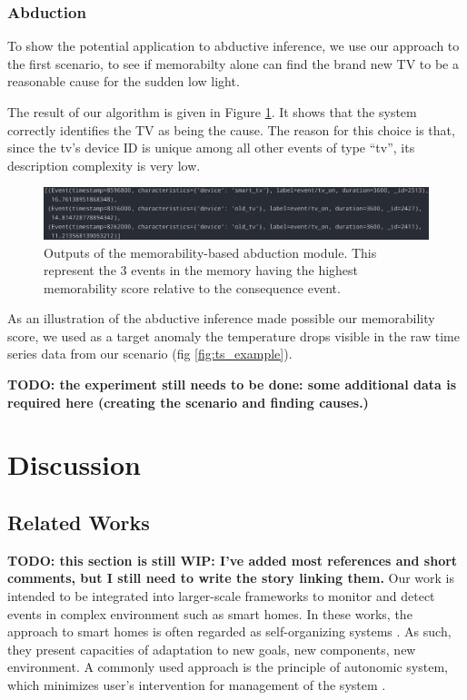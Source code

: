 \documentclass[entropy,article,submit,moreauthors,pdftex]{Definitions/mdpi}
\begin{document}
\subsubsection{Abduction}

To show the potential application to abductive inference, we use our approach to the first scenario, to see if memorabilty alone can find the brand new TV to be a reasonable cause for the sudden low light.

The result of our algorithm is given in Figure \ref{fig:abduction_res}. It shows that the system correctly identifies the TV as being the cause. The reason for this choice is that, since the tv's device ID is unique among all other events of type ``tv'', its description complexity is very low.

\begin{figure}
    \centering
    \includegraphics[width=.8\linewidth]{./figures/abduction_1_results}
    \caption{Outputs of the memorability-based abduction module. This represent the 3 events in the memory having the highest memorability score relative to the consequence event.}
    \label{fig:abduction_res}
\end{figure}

As an illustration of the abductive inference made possible our memorability
score, we used as a target anomaly the temperature drops visible in the raw
time series data from our scenario (fig \ref{fig:ts_example}).

\textbf{TODO: the experiment still needs to be done: some additional data is required here (creating the scenario and finding causes.)}



\section{Discussion}

\subsection{Related Works}
\label{sec:related}
\textbf{TODO: this section is still WIP: I've added most references and short comments, but I still need to write the story linking them.}
Our work is intended to be integrated into larger-scale frameworks to monitor
and detect events in complex environment such as smart homes. In these works, the
approach to smart homes is often regarded as self-organizing systems \cite{kramer_rigorous_2009,kounev_notion_2017}. As such, they present capacities of adaptation to new goals,
new components, new environment. A commonly used approach is the principle of
autonomic system, which minimizes user's intervention for management of the
system \cite{kounev_notion_2017,kephart_vision_2003}.
\end{document}
